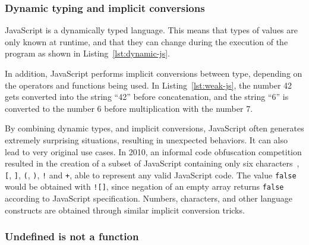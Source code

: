 \subsubsection{Dynamic typing and implicit conversions}%
\label{ssub:dynamic_typing_and_implicit_conversions}

JavaScript is a dynamically typed language.
This means that types of values are only known at runtime,
and that they can change during the execution of the program
as shown in Listing~\ref{lst:dynamic-js}.



In addition, JavaScript performs implicit conversions between type,
depending on the operators and functions being used.
In Listing~\ref{lst:weak-js}, the number 42 gets converted into the string ``42''
before concatenation, and the string ``6'' is converted to the number 6
before multiplication with the number 7.



By combining dynamic types, and implicit conversions,
JavaScript often generates extremely surprising situations,
resulting in unexpected behaviors.
It can also lead to very original use cases.
In 2010, an informal code obfuscation competition resulted in the creation
of a subset of JavaScript containing only six characters~\cite{jsfuck},
\verb|[|, \verb|]|, \verb|(|, \verb|)|, \verb|!| and \verb|+|,
able to represent any valid JavaScript code.
The value \verb|false| would be obtained with \verb|![]|,
since negation of an empty array returns \verb|false| according to JavaScript specification.
Numbers, characters, and other language constructs are obtained through similar
implicit conversion tricks.

\subsubsection{Undefined is not a function}%
\label{ssub:undefined_is_not_a_function}

